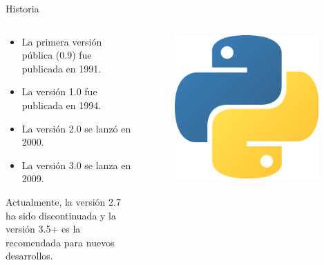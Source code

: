\documentclass[10pt]{beamer}
\begin{document}
\begin{frame}{Historia}
    \begin{columns}
        \begin{column}{0.6\textwidth}
            \begin{itemize}
                \item La primera versión pública (0.9) fue publicada en 1991.
                \item La versión 1.0 fue publicada en 1994.
                \item La versión 2.0 se lanzó en 2000.
                \item La versión 3.0 se lanza en 2009.
            \end{itemize}
            Actualmente, la versión 2.7 ha sido discontinuada y la versión 3.5+ es la recomendada 
            para nuevos desarrollos.
        \end{column}
        \begin{column}{0.4\textwidth}
            \begin{figure}[!h] 
                \centering
                \includegraphics[width=0.95\textwidth]{img/logo}
            \end{figure}
        \end{column}
    \end{columns}
    
\end{frame}
\end{document}
